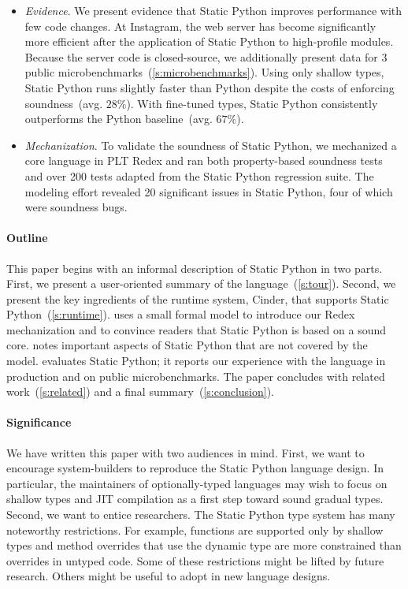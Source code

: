 \documentclass[english,cleveref,submission]{programming}
\newcommand{\SP}{Static Python}
\newcommand{\pctnum}[1]{$#1\%$}
\newcommand{\numbenchmark}{3}
\begin{document}
\begin{itemize}
  \item
    \emph{Evidence}.
    We present evidence that \SP{} improves performance with few code changes.
    At Instagram, the web server has become significantly more efficient
    after the application of \SP{} to high-profile modules.
    Because the server code is closed-source, we additionally present data for
    \numbenchmark{} public microbenchmarks~(\cref{s:microbenchmarks}).
    Using only shallow types, \SP{} runs slightly faster than Python
    despite the costs of enforcing soundness~(avg. \pctnum{28}).
    With fine-tuned types, \SP{} consistently outperforms the Python baseline~(avg. \pctnum{67}).

  \item
    \emph{Mechanization}.
    To validate the soundness of \SP{}, we mechanized a core language in PLT Redex
    and ran both property-based soundness tests and over 200 tests adapted from the \SP{} regression suite.
    The modeling effort revealed 20 significant issues in \SP{},
    four of which were soundness bugs.

\end{itemize}

\paragraph*{Outline}

This paper begins with an informal description of \SP{} in two parts.
First, we present a user-oriented summary of the language~(\cref{s:tour}).
Second, we present the key ingredients of the runtime system, Cinder,
that supports \SP{}~(\cref{s:runtime}).
 uses a small formal model to introduce our Redex mechanization
and to convince readers that \SP{} is based on a sound core.
 notes important aspects of \SP{} that are not covered by the model.
 evaluates \SP{}; it reports our experience with the language in
production and on public microbenchmarks.
The paper concludes with related work~(\cref{s:related})
and a final summary~(\cref{s:conclusion}).


\paragraph*{Significance}

We have written this paper with two audiences in mind.
First, we want to encourage system-builders to reproduce the
\SP{} language design.
In particular, the maintainers of optionally-typed languages
may wish to focus on shallow types and JIT compilation as a
first step toward sound gradual types.
Second, we want to entice researchers.
The \SP{} type system has many noteworthy restrictions.
For example, functions are supported only by shallow types
and method overrides that use the dynamic type are more constrained
than overrides in untyped code.
Some of these restrictions might be lifted by future research.
Others might be useful to adopt in new language designs.
\end{document}
